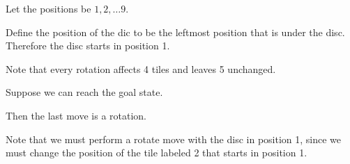 \documentclass[12pt]{article}
\begin{document}
Let the positions be $1, 2, \ldots 9$.

Define the position of the dic to be the leftmost position that is under the disc. Therefore the
disc starts in position 1.

Note that every rotation affects 4 tiles and leaves 5 unchanged.

Suppose we can reach the goal state.

Then the last move is a rotation.

Note that we must perform a rotate move with the disc in position 1, since we must change the
position of the tile labeled 2 that starts in position 1.
\end{document}
